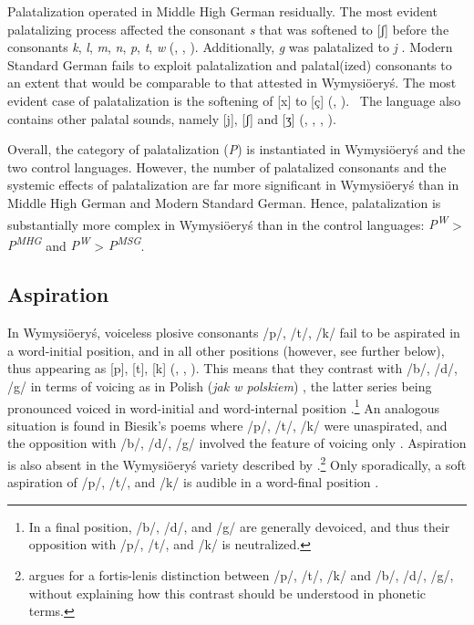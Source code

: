 \documentclass[output=paper,hidelinks]{langscibook}
\begin{document}
Palatalization operated in Middle High German residually. The most evident palatalizing process affected the consonant \textit{s} that was softened to [ʃ] before the consonants \textit{k}, \textit{l}, \textit{m}, \textit{n}, \textit{p}, \textit{t}, \textit{w} (\citealt{paul_mittelhochdeutsche_2007}, \citealt[196, 209]{fagan_german_2009}, \citealt[41]{hennings_einfuhrung_2012}). Additionally, \textit{g} was palatalized to \textit{j} \citep[37]{paul_mittelhochdeutsche_2007}. Modern Standard German fails to exploit palatalization and palatal(ized) consonants to an extent that would be comparable to that attested in Wymysiöeryś. The most evident case of palatalization is the softening of [x] to [ç] (\citealt[26--27]{fagan_german_2009}, \citealt[45]{obrein_german_2016}).%
~The language also contains other palatal sounds, namely [j], [ʃ] and [ʒ] (\citealt[92, 95, 104]{johnson_exploring_2008}, \citealt[9, 12--13]{fagan_german_2009}, \citealt{van_der_hoek_palatalization_2010}, \citealt[14, 16]{obrein_german_2016}).

Overall, the category of palatalization (\textit{P}) is instantiated in Wymysiöeryś and the two control languages. However, the number of palatalized consonants and the systemic effects of palatalization are far more significant in Wymysiöeryś than in Middle High German and Modern Standard German. Hence, palatalization is substantially more complex in Wymysiöeryś than in the control languages: \textit{P\textsuperscript{W}} > \textit{P\textsuperscript{MHG}} and \textit{P\textsuperscript{W}} > \textit{P\textsuperscript{MSG}}.

\subsection{Aspiration}\label{sec:wymsorys:3.10}
\largerpage
In Wymysiöeryś, voiceless plosive consonants /p/, /t/, /k/ fail to be aspirated in a word-initial position, and in all other positions (however, see further below), thus appearing as [p], [t], [k] (\citealt[14--15, 28]{kleczkowski_dialekt_1920}, \citealt[xiv--xv]{mojmir_worterbuch}, \citealt[17--19]{andrason_grammar_2016}). This means that they contrast with /b/, /d/, /g/ in terms of voicing as in Polish (\textit{jak w polskiem}) \citep[28]{kleczkowski_dialekt_1920}, the latter series being pronounced voiced in word-initial and word-internal position \citep[17--19]{andrason_grammar_2016}.\footnote{In a final position, /b/, /d/, and /g/ are generally devoiced, and thus their opposition with /p/, /t/, and /k/ is neutralized.} An analogous situation is found in Biesik's poems where /p/, /t/, /k/ were unaspirated, and the opposition with /b/, /d/, /g/ involved the feature of voicing only \citep[399--409]{wicherkiewicz_making_2003}. Aspiration is also absent in the Wymysiöeryś variety described by \citet[42]{lasatowicz_deutsche_1994}.\footnote{\citet[42]{lasatowicz_deutsche_1994} argues for a fortis-lenis distinction between /p/, /t/, /k/ and /b/, /d/, /g/, without explaining how this contrast should be understood in phonetic terms.} Only sporadically, a soft aspiration of /p/, /t/, and /k/ is audible in a word-final position \citep[19]{andrason_grammar_2016}.
\end{document}
